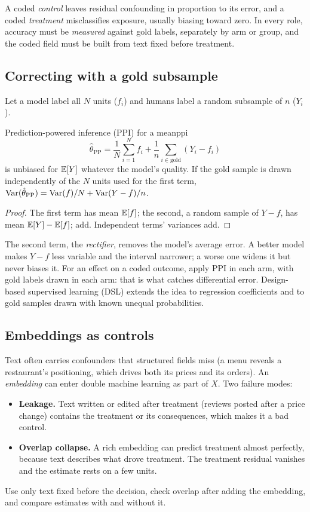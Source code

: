 \documentclass[11pt]{article}
\begin{document}
A coded \emph{control} leaves residual confounding in proportion to its error, and a coded \emph{treatment} misclassifies exposure, usually
biasing toward zero. In every role, accuracy must be \emph{measured} against gold labels, separately by arm or group, and the coded field
must be built from text fixed before treatment.

\subsection{Correcting with a gold subsample}

Let a model label all $N$ units ($f_i$) and humans label a random subsample of $n$ ($Y_i$).

\begin{prop}{Prediction-powered inference (PPI) for a mean}{ppi}
\[
  \hat\theta_{\text{PP}} = \frac1N\sum_{i=1}^N f_i + \frac1n\sum_{i \in \text{gold}}(Y_i - f_i)
\]
is unbiased for $\mathbb{E}[Y]$ whatever the model's quality. If the gold sample is drawn independently of the $N$ units used for the first
term, $\operatorname{Var}(\hat\theta_{\text{PP}}) = \operatorname{Var}(f)/N + \operatorname{Var}(Y - f)/n$.
\end{prop}
\begin{proof}
The first term has mean $\mathbb{E}[f]$; the second, a random sample of $Y - f$, has mean $\mathbb{E}[Y] - \mathbb{E}[f]$; add. Independent terms' variances add.
\end{proof}

The second term, the \emph{rectifier}, removes the model's average error. A better model makes $Y - f$ less variable and the interval
narrower; a worse one widens it but never biases it. For an effect on a coded outcome, apply PPI in each arm, with gold labels drawn in
each arm: that is what catches differential error. Design-based supervised learning (DSL) extends the idea to regression coefficients and
to gold samples drawn with known unequal probabilities.

\subsection{Embeddings as controls}

Text often carries confounders that structured fields miss (a menu reveals a restaurant's positioning, which drives both its prices and its
orders). An \emph{embedding} can enter double machine learning as part of $X$. Two failure modes:
\begin{itemize}
  \item \textbf{Leakage.} Text written or edited after treatment (reviews posted after a price change) contains the treatment or its
  consequences, which makes it a bad control.
  \item \textbf{Overlap collapse.} A rich embedding can predict treatment almost perfectly, because text describes what drove treatment. The
  treatment residual vanishes and the estimate rests on a few units.
\end{itemize}
Use only text fixed before the decision, check overlap after adding the embedding, and compare estimates with and without it.
\end{document}
